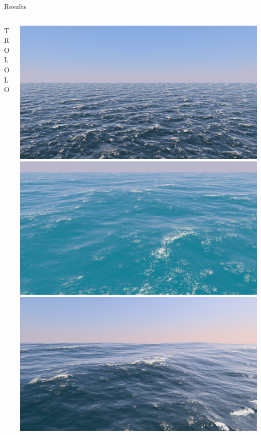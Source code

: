 \documentclass[final,hyperref={pdfpagelabels=true}]{beamer}
\begin{document}
\begin{frame}
\begin{center}
\begin{minipage}{\textwidth}
\begin{block}{Results}
\begin{columns}[t]
				\begin{column}{0.25\linewidth}
				TROLOLO
				\end{column}
				\begin{column}{0.75\linewidth}
				\begin{center}
				\noindent
				\includegraphics[width=0.225\columnwidth]{figures/21-06-2018_10-44-51_complete}
				\includegraphics[width=0.225\columnwidth]{figures/21-06-2018_13-45-06_complete}
				\includegraphics[width=0.225\columnwidth]{figures/21-06-2018_12-48-51_complete}	
				\end{center}
				\end{column}
			\end{columns}
		\end{block}
	\end{minipage}
	\end{center}
    

\end{frame}
\end{document}
